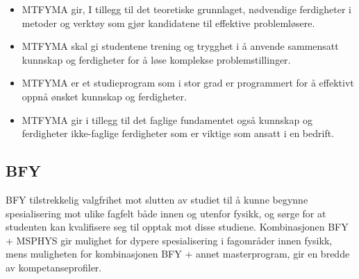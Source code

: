 \begin{itemize}
	\item MTFYMA gir, I tillegg til det teoretiske grunnlaget, nødvendige ferdigheter i metoder og verktøy som gjør kandidatene til effektive problemløsere.
	\item MTFYMA skal gi studentene trening og trygghet i å anvende sammensatt kunnskap og ferdigheter for å løse komplekse problemstillinger.
	\item MTFYMA er et studieprogram som i stor grad er programmert for å effektivt oppnå ønsket kunnskap og ferdigheter.
	\item MTFYMA gir i tillegg til det faglige fundamentet også kunnskap og ferdigheter ikke-faglige ferdigheter som er viktige som ansatt i en bedrift.
\end{itemize}

\subsection{BFY}
BFY tilstrekkelig valgfrihet mot slutten av studiet til å kunne begynne spesialisering mot ulike fagfelt både innen og utenfor fysikk, og sørge for at studenten kan kvalifisere seg til opptak mot disse studiene. Kombinasjonen BFY + MSPHYS gir mulighet for dypere spesialisering i fagområder innen fysikk, mens muligheten for kombinasjonen BFY + annet masterprogram, gir en bredde av kompetanseprofiler.

